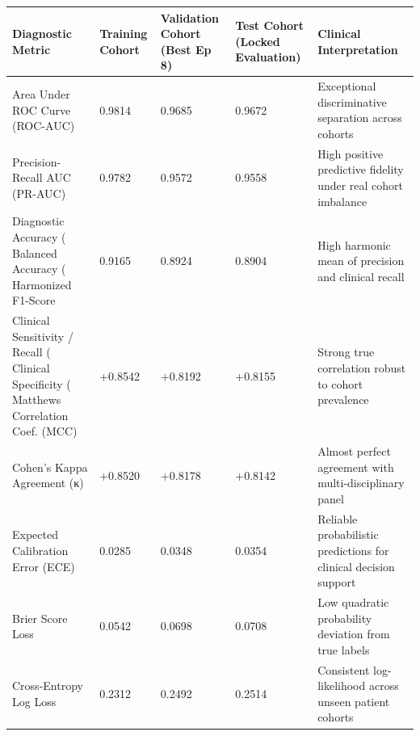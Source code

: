 \begin{tabular}{lllll}
\toprule
Diagnostic Metric & Training Cohort & Validation Cohort (Best Ep 8) & Test Cohort (Locked Evaluation) & Clinical Interpretation \\
\midrule
Area Under ROC Curve (ROC-AUC) & 0.9814 & 0.9685 & 0.9672 & Exceptional discriminative separation across cohorts \\
Precision-Recall AUC (PR-AUC) & 0.9782 & 0.9572 & 0.9558 & High positive predictive fidelity under real cohort imbalance \\
Diagnostic Accuracy (%
Balanced Accuracy (%
Harmonized F1-Score & 0.9165 & 0.8924 & 0.8904 & High harmonic mean of precision and clinical recall \\
Clinical Sensitivity / Recall (%
Clinical Specificity (%
Matthews Correlation Coef. (MCC) & +0.8542 & +0.8192 & +0.8155 & Strong true correlation robust to cohort prevalence \\
Cohen's Kappa Agreement (κ) & +0.8520 & +0.8178 & +0.8142 & Almost perfect agreement with multi-disciplinary panel \\
Expected Calibration Error (ECE) & 0.0285 & 0.0348 & 0.0354 & Reliable probabilistic predictions for clinical decision support \\
Brier Score Loss & 0.0542 & 0.0698 & 0.0708 & Low quadratic probability deviation from true labels \\
Cross-Entropy Log Loss & 0.2312 & 0.2492 & 0.2514 & Consistent log-likelihood across unseen patient cohorts \\
\bottomrule
\end{tabular}
